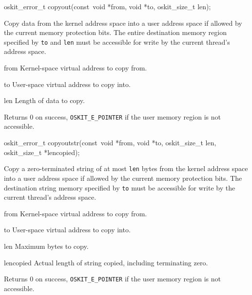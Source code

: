 \begin{apisyn}

        \funcproto oskit_error_t
		copyout(const~void *from, void *to, oskit_size_t len);
\end{apisyn}
\begin{apidesc}
	Copy data
	from the kernel address space into a user address space
	if allowed by the current memory protection bits.
        The entire destination memory region specified by \texttt{to}
	and \texttt{len} must be accessible for write by the current
	thread's address space.
\end{apidesc}
\begin{apiparm}
	\item[from]
		Kernel-space virtual address to copy from.
	\item[to]
		User-space virtual address to copy into.
	\item[len]
		Length of data to copy.
\end{apiparm}
\begin{apiret}
        Returns 0 on success, \texttt{OSKIT_E_POINTER} if the user memory
	region is not accessible.
\end{apiret}

\begin{apisyn}

        \funcproto oskit_error_t
		copyoutstr(const~void *from, void *to, oskit_size_t len,
		        \outparam oskit_size_t *lencopied);
\end{apisyn}
\begin{apidesc}
	Copy a zero-terminated string of at most \texttt{len} bytes
	from the kernel address space into a user address space
	if allowed by the current memory protection bits.
        The destination string memory specified by \texttt{to}
	must be accessible for write by the current
	thread's address space.
\end{apidesc}
\begin{apiparm}
	\item[from]
		Kernel-space virtual address to copy from.
	\item[to]
		User-space virtual address to copy into.
	\item[len]
		Maximum bytes to copy.
	\item[lencopied]
		Actual length of string copied, including terminating zero.
\end{apiparm}
\begin{apiret}
        Returns 0 on success, \texttt{OSKIT_E_POINTER} if the user memory
	region is not accessible.
\end{apiret}


